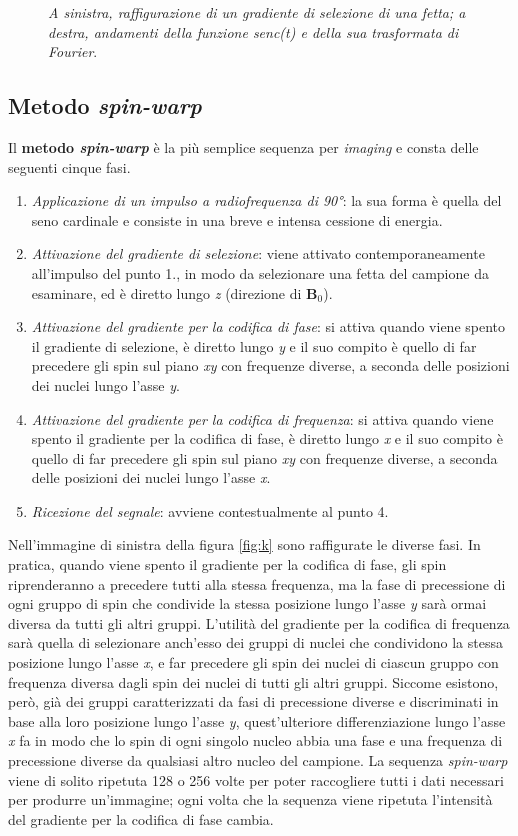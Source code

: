 \documentclass{report}
\newcommand{\figref}[1]{figura \ref{#1}}
\numberwithin{equation}{section}
\numberwithin{figure}{section}
\renewcommand{\Vec}{\bm}
\begin{document}
\begin{figure}[htp]
\caption{\label{fig:mela} \textit{A sinistra, raffigurazione di un gradiente di selezione di una fetta; a destra, andamenti della funzione \textnormal{senc}(t) e della sua trasformata di Fourier}.}
\end{figure}

\subsection{Metodo \textit{spin-warp}}
Il \textbf{metodo \textit{spin-warp}} è la più semplice sequenza per \textit{imaging} e consta delle seguenti cinque fasi.
\begin{enumerate}
    \item \emph{Applicazione di un impulso a radiofrequenza di 90°}: la sua forma è quella del seno cardinale e consiste in una breve e intensa cessione di energia.
    \item \emph{Attivazione del gradiente di selezione}: viene attivato contemporaneamente all'impulso del punto 1., in modo da selezionare una fetta del campione da esaminare, ed è diretto lungo \textit{z} (direzione di $\Vec{B}_0$).
    \item \emph{Attivazione del gradiente per la codifica di fase}: si attiva quando viene spento il gradiente di selezione, è diretto lungo \textit{y} e il suo compito è quello di far precedere gli spin sul piano \textit{xy} con frequenze diverse, a seconda delle posizioni dei nuclei lungo l'asse \textit{y}.
    \item \emph{Attivazione del gradiente per la codifica di frequenza}: si attiva quando viene spento il gradiente per la codifica di fase, è diretto lungo \textit{x} e il suo compito è quello di far precedere gli spin sul piano \textit{xy} con frequenze diverse, a seconda delle posizioni dei nuclei lungo l'asse \textit{x}.
    \item \emph{Ricezione del segnale}: avviene contestualmente al punto 4.
\end{enumerate}
Nell'immagine di sinistra della \figref{fig:k} sono raffigurate le diverse fasi. In pratica, quando viene spento il gradiente per la codifica di fase, gli spin riprenderanno a precedere tutti alla stessa frequenza, ma la fase di precessione di ogni gruppo di spin che condivide la stessa posizione lungo l'asse \textit{y} sarà ormai diversa da tutti gli altri gruppi. L'utilità del gradiente per la codifica di frequenza sarà quella di selezionare anch'esso dei gruppi di nuclei che condividono la stessa posizione lungo l'asse \textit{x}, e far precedere gli spin dei nuclei di ciascun gruppo con frequenza diversa dagli spin dei nuclei di tutti gli altri gruppi. Siccome esistono, però, già dei gruppi caratterizzati da fasi di precessione diverse e discriminati in base alla loro posizione lungo l'asse \textit{y}, quest'ulteriore differenziazione lungo l'asse \textit{x} fa in modo che lo spin di ogni singolo nucleo abbia una fase e una frequenza di precessione diverse da qualsiasi altro nucleo del campione. La sequenza \textit{spin-warp} viene di solito ripetuta 128 o 256 volte per poter raccogliere tutti i dati necessari per produrre un'immagine; ogni volta che la sequenza viene ripetuta l'intensità del gradiente per la codifica di fase cambia.
\end{document}
